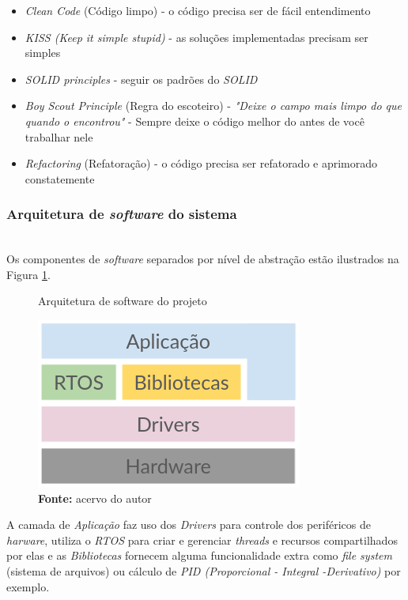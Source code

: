 \documentclass[times, twoside, watermark]{artigo}
\begin{document}
\begin{itemize}
\item \textit{Clean Code} (Código limpo) - o código precisa ser de fácil 
entendimento\cite{martin2009clean}
\item \textit{KISS (Keep it simple stupid)} - as soluções implementadas precisam ser 
simples\cite{martin2018clean}
\item \textit{SOLID principles} - seguir os padrões do \textit{SOLID}
\cite{martin2002agile}
\item \textit{Boy Scout Principle} (Regra do escoteiro) - \textit{"Deixe o campo mais 
limpo do que quando o encontrou"} - Sempre deixe o código melhor do antes de você 
trabalhar nele\cite{martin2009clean}
\item \textit{Refactoring} (Refatoração) - o código precisa ser refatorado e 
aprimorado constatemente\cite{martin2009clean}
\end{itemize}

\subsubsection{Arquitetura de \textit{software} do sistema}\hfill\\
Os componentes de \textit{software} separados por nível de abstração estão ilustrados 
na Figura \ref{fig:arch2}.\hfill\\

\begin{figure}[H]
    \centering
    \caption{Arquitetura de software do projeto}
    \includegraphics[width=0.9\linewidth]{images/arch2.png}
    \caption*{\newline\textbf{Fonte:} acervo do autor}
    \label{fig:arch2}
\end{figure}

A camada de \textit{Aplicação} faz uso dos \textit{Drivers} para controle dos 
periféricos de \textit{harware}, utiliza o \textit{RTOS} para criar e gerenciar
\textit{threads} e recursos compartilhados por elas e as \textit{Bibliotecas}
fornecem alguma funcionalidade extra como \textit{file system} (sistema de arquivos)
ou cálculo de \textit{PID (Proporcional - Integral -Derivativo)} por exemplo.
\end{document}
